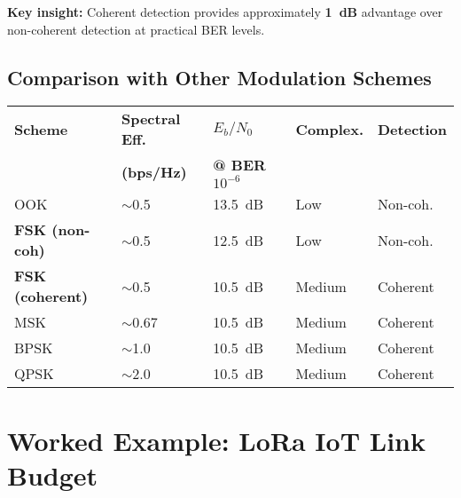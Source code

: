 \textbf{Key insight:} Coherent detection provides approximately \textbf{1~dB} advantage over non-coherent detection at practical BER levels.

\subsection{Comparison with Other Modulation Schemes}

\begin{center}
\small
\begin{tabularx}{\textwidth}{@{}lXXll@{}}
\toprule
\textbf{Scheme} & \textbf{Spectral Eff.} & \textbf{$E_b/N_0$} & \textbf{Complex.} & \textbf{Detection} \\
 & \textbf{(bps/Hz)} & \textbf{@ BER $10^{-6}$} & & \\
\midrule
OOK & $\sim$0.5 & 13.5~dB & Low & Non-coh. \\
\textbf{FSK (non-coh)} & $\sim$0.5 & 12.5~dB & Low & Non-coh. \\
\textbf{FSK (coherent)} & $\sim$0.5 & 10.5~dB & Medium & Coherent \\
MSK & $\sim$0.67 & 10.5~dB & Medium & Coherent \\
BPSK & $\sim$1.0 & 10.5~dB & Medium & Coherent \\
QPSK & $\sim$2.0 & 10.5~dB & Medium & Coherent \\
\bottomrule
\end{tabularx}
\end{center}

\section{Worked Example: LoRa IoT Link Budget}

